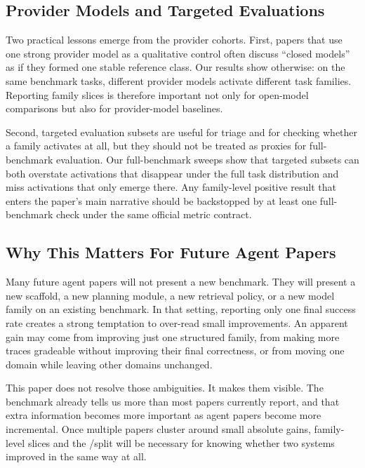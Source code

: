 \subsection{Provider Models and Targeted Evaluations}

Two practical lessons emerge from the provider cohorts. First, papers that use
one strong provider model as a qualitative control often discuss ``closed
models'' as if they formed one stable reference class. Our results show
otherwise: on the same benchmark tasks, different provider models activate
different task families. Reporting family slices is therefore important not
only for open-model comparisons but also for provider-model baselines.

Second, targeted evaluation subsets are useful for triage and for checking
whether a family activates at all, but they should not be treated as proxies
for full-benchmark evaluation. Our full-benchmark sweeps show that targeted
subsets can both overstate activations that disappear under the full task
distribution and miss activations that only emerge there. Any family-level
positive result that enters the paper's main narrative should be backstopped by
at least one full-benchmark check under the same official metric contract.

\subsection{Why This Matters For Future Agent Papers}

Many future agent papers will not present a new benchmark. They will present a
new scaffold, a new planning module, a new retrieval policy, or a new model
family on an existing benchmark. In that setting, reporting only one final
success rate creates a strong temptation to over-read small improvements. An
apparent gain may come from improving just one structured family, from making
more traces gradeable without improving their final correctness, or from moving
one domain while leaving other domains unchanged.

This paper does not resolve those ambiguities. It makes them visible. The
benchmark already tells us more than most papers currently report, and that
extra information becomes more important as agent papers become more
incremental. Once multiple papers cluster around small absolute gains,
family-level slices and the \processmetric/\resultmetric split will be
necessary for knowing whether two systems improved in the same way at all.

